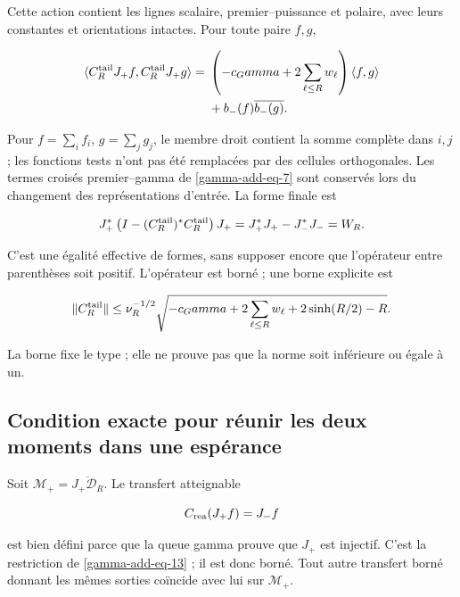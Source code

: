 Cette action contient les lignes scalaire, premier--puissance et polaire, avec leurs constantes et orientations intactes. Pour toute paire \(f,g\),

\begin{equation}
\begin{aligned}
\langle\mathcal C_R^{\rm tail}J_+f,\mathcal C_R^{\rm tail}J_+g\rangle
={}&\left(-c_\Gamma+2\sum_{\ell\le R}w_\ell\right)\langle f,g\rangle\\
&+b_-(f)\overline{b_-(g)}.
\end{aligned}
\label{gamma-add-eq-15}
\end{equation}

Pour \(f=\sum_i f_i\), \(g=\sum_j g_j\), le membre droit contient la somme complète dans \(i,j\) ; les fonctions tests n'ont pas été remplacées par des cellules orthogonales. Les termes croisés premier--gamma de \eqref{gamma-add-eq-7} sont conservés lors du changement des représentations d'entrée. La forme finale est

\begin{equation}
J_+^*\left(I-(\mathcal C_R^{\rm tail})^*\mathcal C_R^{\rm tail}\right)J_+
=J_+^*J_+-J_-^*J_-=\mathcal W_R.
\label{gamma-add-eq-16}
\end{equation}

C'est une égalité effective de formes, sans supposer encore que l'opérateur entre parenthèses soit positif. L'opérateur est borné ; une borne explicite est

\begin{equation}
\|\mathcal C_R^{\rm tail}\|
\le\nu_R^{-1/2}
\sqrt{-c_\Gamma+2\sum_{\ell\le R}w_\ell+2\sinh(R/2)-R}.
\label{gamma-add-display-33}
\end{equation}

La borne fixe le type ; elle ne prouve pas que la norme soit inférieure ou égale à un.

\subsection{Condition exacte pour réunir les deux moments dans une espérance}
\label{gamma-add-sub-375}

Soit \(\mathcal M_+=\overline{J_+\mathcal D_R}\). Le transfert atteignable

\begin{equation}
C_{\rm rea}(J_+f)=J_-f
\label{gamma-add-display-34}
\end{equation}

est bien défini parce que la queue gamma prouve que \(J_+\) est injectif. C'est la restriction de \eqref{gamma-add-eq-13} ; il est donc borné. Tout autre transfert borné donnant les mêmes sorties coïncide avec lui sur \(\mathcal M_+\).

